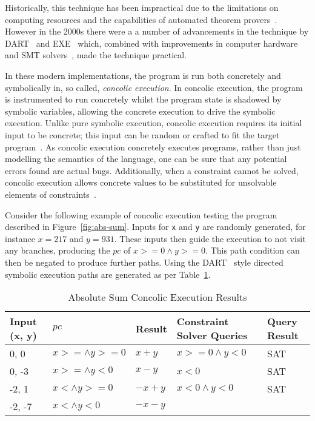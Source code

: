 \documentclass[]{final_report}
\begin{document}
Historically, this technique has been impractical due to the limitations on computing resources and the capabilities of automated theorem provers~\cite{king1976symbolic}. However in the 2000s there were a a number of advancements in the technique by DART~\cite{godefroid2005dart} and EXE~\cite{cadar2008exe} which, combined with improvements in computer hardware and SMT solvers~\cite{de2011satisfiability}, made the technique practical.

In these modern implementations, the program is run both concretely and symbolically in, so called, \textit{concolic execution}. In concolic execution, the program is instrumented to run concretely whilst the program state is shadowed by symbolic variables, allowing the concrete execution to drive the symbolic execution. Unlike pure symbolic execution, concolic execution requires its initial input to be concrete; this input can be random or crafted to fit the target program~\cite{godefroid2008grammar,cadar2013symbolic}. As concolic execution concretely executes programs, rather than just modelling the semantics of the language, one can be sure that any potential errors found are actual bugs. Additionally, when a constraint cannot be solved, concolic execution allows concrete values to be substituted for unsolvable elements of constraints~\cite{sen2007concolic,sen2005cute}.

Consider the following example of concolic execution testing the program described in Figure~\ref{fig:abs-sum}. Inputs for \lstinline{x} and \lstinline{y} are randomly generated, for instance $x=217$ and $y=931$. These inputs then guide the execution to not visit any branches, producing the $pc$ of $x >= 0 \land y >=0$. This path condition can then be negated to produce further paths. Using the DART~\cite{godefroid2005dart} style directed symbolic execution paths are generated as per Table~\ref{abs-sum-ce-table}.

\begin{table}[]
\centering
\begin{tabular}{|l|l|l|l|l|}
\hline
Input (x, y) & $pc$ & Result & Constraint Solver Queries & Query Result \\ \hline
0, 0 & $x >= \land y >= 0$ & $x+y$ & $x >=0 \land y < 0 $ & SAT \\ \hline
0, -3 & $x >= \land y < 0$ & $x - y$ & $x <0 $ & SAT \\ \hline
-2, 1 & $x < \land y >= 0$ & $-x+y$ & $x<0 \land y < 0 $ & SAT \\ \hline
-2, -7 & $x < \land y < 0$ & $-x-y$ &  &  \\ \hline
\end{tabular}
\caption{Absolute Sum Concolic Execution Results}
\label{abs-sum-ce-table}
\end{table}
\end{document}
